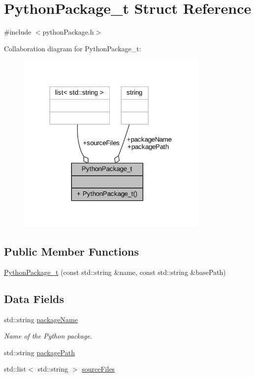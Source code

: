 \hypertarget{struct_python_package__t}{}\section{Python\+Package\+\_\+t Struct Reference}
\label{struct_python_package__t}


{\ttfamily \#include $<$python\+Package.\+h$>$}



Collaboration diagram for Python\+Package\+\_\+t\+:
\nopagebreak
\begin{figure}[H]
\begin{center}
\leavevmode
\includegraphics[width=267pt]{struct_python_package__t__coll__graph}
\end{center}
\end{figure}
\subsection*{Public Member Functions}
\begin{DoxyCompactItemize}
\item 
\hyperlink{struct_python_package__t_a5a5eabff4e325877e337e311c617942e}{Python\+Package\+\_\+t} (const std\+::string \&name, const std\+::string \&base\+Path)
\end{DoxyCompactItemize}
\subsection*{Data Fields}
\begin{DoxyCompactItemize}
\item 
std\+::string \hyperlink{struct_python_package__t_a4f500d4617afea76ed988ef1ae7dff63}{package\+Name}
\begin{DoxyCompactList}\small\item\em Name of the Python package. \end{DoxyCompactList}\item 
std\+::string \hyperlink{struct_python_package__t_ac6b92b4a28c3c4ebae50acb9e7b7a8cb}{package\+Path}
\item 
std\+::list$<$ std\+::string $>$ \hyperlink{struct_python_package__t_a64eef6beea9fcc932488bf8bcb89c3ed}{source\+Files}
\end{DoxyCompactItemize}


